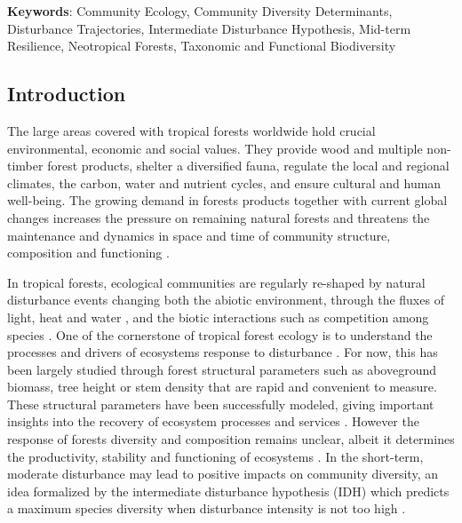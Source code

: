 \documentclass[
  11pt,
  french,
  A4paper,
  extrafontsizes,onecolumn,openright
  ]{memoir}
\begin{document}
\textbf{Keywords}: Community Ecology, Community Diversity Determinants,
Disturbance Trajectories, Intermediate Disturbance Hypothesis, Mid-term
Resilience, Neotropical Forests, Taxonomic and Functional Biodiversity

\subsection{Introduction}\label{introduction-1}

The large areas covered with tropical forests worldwide hold crucial
environmental, economic and social values. They provide wood and
multiple non-timber forest products, shelter a diversified fauna,
regulate the local and regional climates, the carbon, water and nutrient
cycles, and ensure cultural and human well-being. The growing demand in
forests products together with current global changes increases the
pressure on remaining natural forests \autocite{Morales-Hidalgo2015} and
threatens the maintenance and dynamics in space and time of community
structure, composition and functioning \autocite{Anderson-Teixeira2013}.

In tropical forests, ecological communities are regularly re-shaped by
natural disturbance events changing both the abiotic environment,
through the fluxes of light, heat and water
\autocite{Goulamoussene2017}, and the biotic interactions such as
competition among species \autocite{Chesson2000}. One of the cornerstone
of tropical forest ecology is to understand the processes and drivers of
ecosystems response to disturbance \autocite{Chazdon2003a}. For now,
this has been largely studied through forest structural parameters such
as aboveground biomass, tree height or stem density
\autocites{Piponiot2016}{Rutishauser2016} that are rapid and convenient
to measure. These structural parameters have been successfully modeled,
giving important insights into the recovery of ecosystem processes and
services \autocite{Herault2018}. However the response of forests
diversity and composition remains unclear, albeit it determines the
productivity, stability and functioning of ecosystems
\autocites{Tilman2014}{Liang2016}. In the short-term, moderate
disturbance may lead to positive impacts on community diversity, an idea
formalized by the intermediate disturbance hypothesis (IDH) which
predicts a maximum species diversity when disturbance intensity is not
too high \autocites{Molino2001}{Kariuki2006a}.
\end{document}
